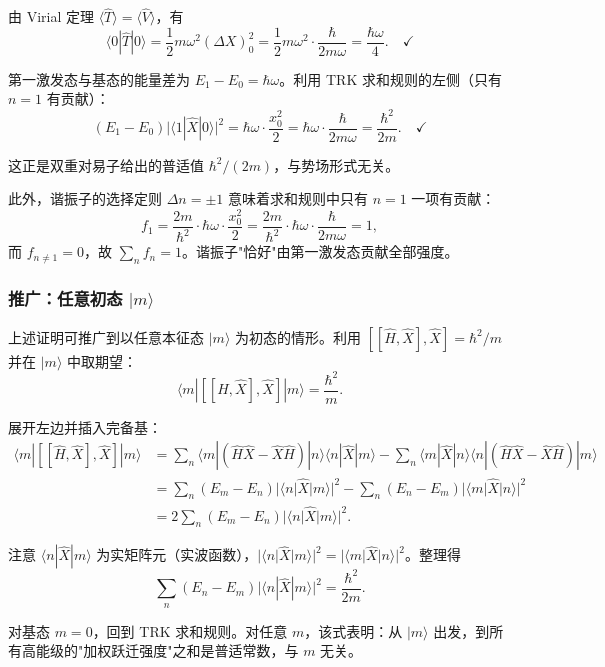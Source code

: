 由 Virial 定理 $\langle\hat{T}\rangle = \langle\hat{V}\rangle$，有
\[
\langle 0|\hat{T}|0\rangle = \frac12 m\omega^2 (\Delta X)_0^2
= \frac12 m\omega^2 \cdot \frac{\hbar}{2m\omega} = \frac{\hbar\omega}{4}.\quad\checkmark
\]

第一激发态与基态的能量差为 $E_1-E_0=\hbar\omega$。利用 TRK 求和规则的左侧（只有 $n=1$ 有贡献）：
\[
(E_1-E_0)\bigl|\langle 1|\hat{X}|0\rangle\bigr|^2 = \hbar\omega \cdot \frac{x_0^2}{2}
= \hbar\omega \cdot \frac{\hbar}{2m\omega} = \frac{\hbar^2}{2m}.\quad\checkmark
\]

这正是双重对易子给出的普适值 $\hbar^2/(2m)$，与势场形式无关。

此外，谐振子的选择定则 $\Delta n=\pm 1$ 意味着求和规则中只有 $n=1$ 一项有贡献：
\[
f_1 = \frac{2m}{\hbar^2}\cdot\hbar\omega\cdot\frac{x_0^2}{2}
= \frac{2m}{\hbar^2}\cdot\hbar\omega\cdot\frac{\hbar}{2m\omega} = 1,
\]
而 $f_{n\neq 1}=0$，故 $\sum_n f_n = 1$。谐振子"恰好"由第一激发态贡献全部强度。

\subsubsection{推广：任意初态 $|m\rangle$}

上述证明可推广到以任意本征态 $|m\rangle$ 为初态的情形。利用 $[[\hat{H},\hat{X}],\hat{X}]=\hbar^2/m$ 并在 $|m\rangle$ 中取期望：
\[
\langle m|[[\hat{H},\hat{X}],\hat{X}]|m\rangle = \frac{\hbar^2}{m}.
\]

展开左边并插入完备基：
\begin{align*}
\langle m|[[\hat{H},\hat{X}],\hat{X}]|m\rangle
&= \sum_n\langle m|(\hat{H}\hat{X}-\hat{X}\hat{H})|n\rangle\langle n|\hat{X}|m\rangle
- \sum_n\langle m|\hat{X}|n\rangle\langle n|(\hat{H}\hat{X}-\hat{X}\hat{H})|m\rangle \\
&= \sum_n(E_m-E_n)|\langle n|\hat{X}|m\rangle|^2
- \sum_n(E_n-E_m)|\langle m|\hat{X}|n\rangle|^2 \\
&= 2\sum_n(E_m-E_n)|\langle n|\hat{X}|m\rangle|^2.
\end{align*}

注意 $\langle n|\hat{X}|m\rangle$ 为实矩阵元（实波函数），$|\langle n|\hat{X}|m\rangle|^2=|\langle m|\hat{X}|n\rangle|^2$。整理得
\begin{equation}
\boxed{\sum_n(E_n-E_m)\bigl|\langle n|\hat{X}|m\rangle\bigr|^2 = \frac{\hbar^2}{2m}.}
\end{equation}

对基态 $m=0$，回到 TRK 求和规则。对任意 $m$，该式表明：从 $|m\rangle$ 出发，到所有高能级的"加权跃迁强度"之和是普适常数，与 $m$ 无关。

